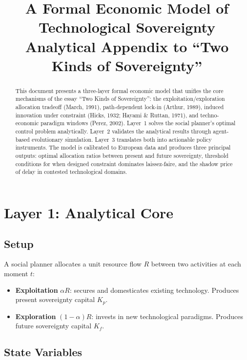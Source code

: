 \documentclass[11pt,a4paper]{article}
\title{\textbf{A Formal Economic Model of Technological Sovereignty}\\[0.5em]
\large Analytical Appendix to ``Two Kinds of Sovereignty''}
\author{}
\date{}
\theoremstyle{remark}
\begin{document}
\maketitle

\begin{abstract}
This document presents a three-layer formal economic model that unifies the core mechanisms of the essay ``Two Kinds of Sovereignty'': the exploitation/exploration allocation tradeoff (March, 1991), path-dependent lock-in (Arthur, 1989), induced innovation under constraint (Hicks, 1932; Hayami \& Ruttan, 1971), and techno-economic paradigm windows (Perez, 2002). Layer~1 solves the social planner's optimal control problem analytically. Layer~2 validates the analytical results through agent-based evolutionary simulation. Layer~3 translates both into actionable policy instruments. The model is calibrated to European data and produces three principal outputs: optimal allocation ratios between present and future sovereignty, threshold conditions for when designed constraint dominates laissez-faire, and the shadow price of delay in contested technological domains.
\end{abstract}

\tableofcontents
\newpage

\section{Layer 1: Analytical Core}

\subsection{Setup}

A social planner allocates a unit resource flow $R$ between two activities at each moment $t$:

\begin{itemize}
    \item \textbf{Exploitation} $\alpha R$: secures and domesticates existing technology. Produces present sovereignty capital $K_p$.
    \item \textbf{Exploration} $(1-\alpha)R$: invests in new technological paradigms. Produces future sovereignty capital $K_f$.
\end{itemize}

\subsection{State Variables}
\end{document}
